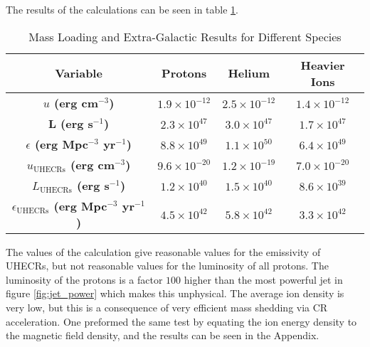 The results of the calculations can be seen in table \ref{tab:emissivity_mass_load}.

\begin{table}[H]
    \centering
    \begin{tabular}{|c|c|c|c|}
    \hline
    \textbf{Variable} & \textbf{Protons} & \textbf{Helium} & \textbf{Heavier Ions} \\
    \hline
    \textbf{$u$ (erg cm$^{-3}$)} & \(1.9 \times 10^{-12}\) & \(2.5 \times 10^{-12}\) & \(1.4 \times 10^{-12}\) \\
    \hline
    \textbf{L (erg s$^{-1}$)} & \(2.3 \times 10^{47}\) & \(3.0 \times 10^{47}\) & \(1.7 \times 10^{47}\) \\
    \hline
    \textbf{$\epsilon$ (erg Mpc$^{-3}$ yr$^{-1}$)} & \(8.8 \times 10^{49}\) & \(1.1 \times 10^{50}\) & \(6.4 \times 10^{49}\) \\
    \hline
    \textbf{$u_{\text{UHECRs}}$ (erg cm$^{-3}$)} & \(9.6 \times 10^{-20}\) & \(1.2\times 10^{-19}\) & \(7.0 \times 10^{-20}\) \\
    \hline
    \textbf{$L_{\text{UHECRs}}$ (erg s$^{-1}$)} & \(1.2 \times 10^{40}\) & \(1.5 \times 10^{40}\) & \(8.6 \times 10^{39}\) \\
    \hline
    \textbf{$\epsilon_{\text{UHECRs}}$  (erg Mpc$^{-3}$ yr$^{-1}$)} & \(4.5 \times 10^{42}\) & \(5.8 \times 10^{42}\) & \(3.3 \times 10^{42}\) \\
    \hline
    \end{tabular}
    \caption{Mass Loading and Extra-Galactic Results for Different Species}
    \label{tab:emissivity_mass_load}
\end{table}
 
The values of the calculation give reasonable values for the emissivity of UHECRs, but not reasonable values for the luminosity of all protons. The luminosity of the protons is a factor $100$ higher than the most powerful jet in figure \ref{fig:jet_power} which makes this unphysical. The average ion density is very low,  but this is a consequence of very efficient mass shedding via CR acceleration. One preformed the same test by equating the ion energy density to the magnetic field density, and the results can be seen in the Appendix. 




